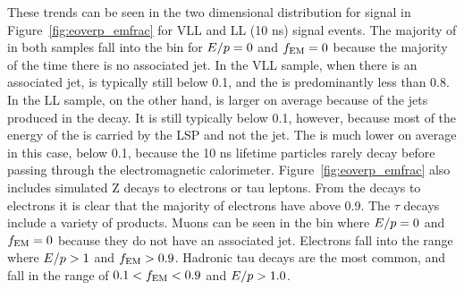 These trends can be seen in the two dimensional distribution for signal in Figure~\ref{fig:eoverp_emfrac} for \ac{VLL} and \ac{LL} (10 ns) signal events.
The majority of \rhadrons in both samples fall into the bin for $E/p = 0$ and $f_\mathrm{EM} = 0$ because the majority of the time there is no associated jet. 
In the \ac{VLL} sample, when there is an associated jet, \ep is typically still below 0.1, and the \emfrac is predominantly less than 0.8.
In the \ac{LL} sample, on the other hand, \ep is larger on average because of the jets produced in the \rhadron decay.
It is still typically below 0.1, however, because most of the energy of the \rhadron is carried by the \ac{LSP} and not the jet.
The \emfrac is much lower on average in this case, below 0.1, because the 10 ns lifetime particles rarely decay before passing through the electromagnetic calorimeter.
Figure~\ref{fig:eoverp_emfrac} also includes simulated Z decays to electrons or tau leptons.
From the decays to electrons it is clear that the majority of electrons have \emfrac above 0.9.
The $\tau$ decays include a variety of products.
Muons can be seen in the bin where $E/p = 0$ and $f_\mathrm{EM} = 0$ because they do not have an associated jet.
Electrons fall into the range where $E/p > 1$ and $f_\mathrm{EM} > 0.9$.
Hadronic tau decays are the most common, and fall in the range of $0.1 < f_\mathrm{EM} < 0.9$ and $E/p > 1.0$. 

